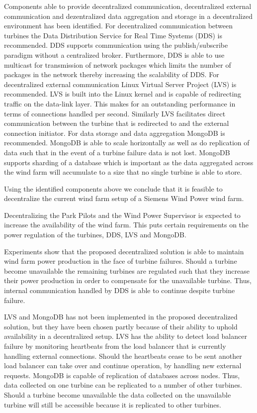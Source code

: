 Components able to provide decentralized communication, decentralized external communication and dezentralized data aggregation and storage in a decentralized environment has been identified. For decentralized communication between turbines the Data Distribution Service for Real Time Systems (DDS) is recommended. DDS supports communication using the publish/subscribe paradigm without a centralized broker. Furthermore, DDS is able to use multicast for transmission of network packages which limits the number of packages in the network thereby increasing the scalability of DDS. For decentralized external communication Linux Virtual Server Project (LVS) is recommended. LVS is built into the Linux kernel and is capable of redirecting traffic on the data-link layer. This makes for an outstanding performance in terms of connections handled per second. Similarly LVS facilitates direct communication between the turbine that is redirected to and the external connection initiator. For data storage and data aggregation MongoDB is recommended. MongoDB is able to scale horizontally as well as do replication of data such that in the event of a turbine failure data is not lost. MongoDB supports sharding of a database which is important as the data aggregated across the wind farm will accumulate to a size that no single turbine is able to store.

Using the identified components above we conclude that it is feasible to decentralize the current wind farm setup of a Siemens Wind Power wind farm.

Decentralizing the Park Pilots and the Wind Power Supervisor is expected to increase the availability of the wind farm. This puts certain requirements on the power regulation of the turbines, DDS, LVS and MongoDB.

Experiments show that the proposed decentralized solution is able to maintain wind farm power production in the face of turbine failures. Should a turbine become unavailable the remaining turbines are regulated such that they increase their power production in order to compensate for the unavailable turbine. Thus, internal communication handled by DDS is able to continue despite turbine failure.

LVS and MongoDB has not been implemented in the proposed decentralized solution, but they have been chosen partly because of their ability to uphold availability in a decentralized setup. LVS has the ability to detect load balancer failure by monitoring heartbeats from the load balancer that is currently handling external connections. Should the heartbeats cease to be sent another load balancer can take over and continue operation, by handling new external requests. MongoDB is capable of replication of databases across nodes. Thus, data collected on one turbine can be replicated to a number of other turbines. Should a turbine become unavailable the data collected on the unavailable turbine will still be accessible because it is replicated to other turbines.

